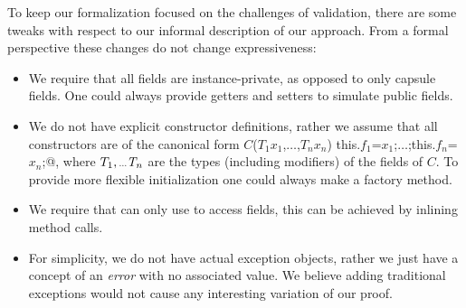 To keep our formalization focused on
the challenges of validation, 
there are some
tweaks with respect to our informal description of our approach.
From a formal perspective 
these changes do not change expressiveness:
\begin{itemize}
\item We require that all fields are instance-private, as opposed to only capsule fields. One could always provide getters and setters to simulate public fields.
\item We do not have explicit constructor definitions, rather we assume that all constructors are of the canonical form
\Q@$C$($T_1 x_1$,$\ldots$,$T_n x_n$) {this.$f_1$=$x_1$;$\ldots$;this.$f_n$=$x_n$;}@,
 where $T_1,\ldots\T_n$ are the types (including modifiers) of the fields of $C$.
To provide more flexible initialization one could always make a factory method.
\item We require that \validate{} can only use \Q@this@ to access fields,
this can be achieved by inlining method calls.
\item For simplicity, we do not have actual exception objects,
rather we just have a concept of an \emph{error} with no associated value.
We believe adding traditional exceptions would not cause any interesting variation of our proof.
\end{itemize}


